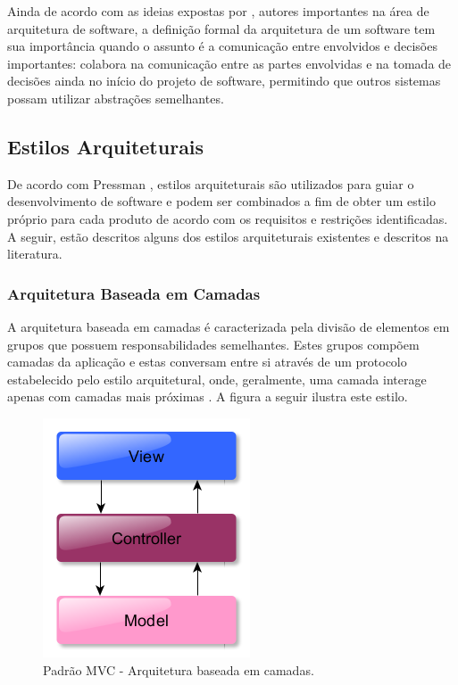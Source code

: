 Ainda de acordo com as ideias expostas por \cite{bass_software_archi_practice_2003}, autores importantes na área de arquitetura de software, a definição formal da arquitetura de um software tem sua importância quando o assunto é a comunicação entre envolvidos e decisões importantes: colabora na comunicação entre as partes envolvidas e na tomada de decisões ainda no início do projeto de software, permitindo que outros sistemas possam utilizar abstrações semelhantes.

\subsection{Estilos Arquiteturais}
De acordo com Pressman \cite{pressman2006engenharia}, estilos arquiteturais são utilizados para guiar o desenvolvimento de software e podem ser combinados a fim de obter um estilo próprio para cada produto de acordo com os requisitos e restrições identificadas. A seguir, estão descritos alguns dos estilos arquiteturais existentes e descritos na literatura.

\subsubsection{Arquitetura Baseada em Camadas}
A arquitetura baseada em camadas é caracterizada pela divisão de elementos em grupos que possuem responsabilidades semelhantes. Estes grupos compõem camadas da aplicação e estas conversam entre si através de um protocolo estabelecido pelo estilo arquitetural, onde, geralmente, uma camada interage apenas com camadas mais próximas \cite{pressman2006engenharia}. A figura a seguir ilustra este estilo.

\begin{figure}[htb]
\centering
\includegraphics[scale=0.5]{figuras/modelo_mvc.PNG}
\caption{Padrão MVC - Arquitetura baseada em camadas.}
\label{modelo_mvc}
\end{figure}

